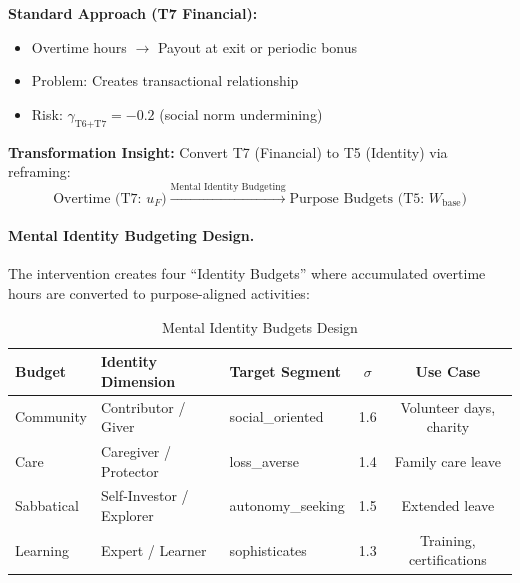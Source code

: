 \begin{tcolorbox}[colback=red!5!white, colframe=red!75!black,
    title=\textbf{Design Challenge: T7 Crowding-Out}]

\textbf{Standard Approach (T7 Financial):}
\begin{itemize}[nosep]
    \item Overtime hours $\rightarrow$ Payout at exit or periodic bonus
    \item Problem: Creates transactional relationship
    \item Risk: $\gamma_{\text{T6+T7}} = -0.2$ (social norm undermining)
\end{itemize}

\textbf{Transformation Insight:} Convert T7 (Financial) to T5 (Identity) via reframing:
\begin{equation}
\text{Overtime (T7: } u_F\text{)} \xrightarrow{\text{Mental Identity Budgeting}} \text{Purpose Budgets (T5: } W_{\text{base}}\text{)}
\label{eq:hhh-t7-t5-transformation}
\end{equation}

\end{tcolorbox}

\paragraph{Mental Identity Budgeting Design.}

The intervention creates four ``Identity Budgets'' where accumulated overtime hours are converted to purpose-aligned activities:

\begin{table}[htbp]
\centering
\caption{Mental Identity Budgets Design}
\label{tab:hhh-identity-budgets}
\renewcommand{\arraystretch}{1.3}
\small
\begin{tabular}{@{}lllcc@{}}
\toprule
\textbf{Budget} & \textbf{Identity Dimension} & \textbf{Target Segment} & \textbf{$\sigma$} & \textbf{Use Case} \\
\midrule
Community & Contributor / Giver & social\_oriented & 1.6 & Volunteer days, charity \\
Care & Caregiver / Protector & loss\_averse & 1.4 & Family care leave \\
Sabbatical & Self-Investor / Explorer & autonomy\_seeking & 1.5 & Extended leave \\
Learning & Expert / Learner & sophisticates & 1.3 & Training, certifications \\
\bottomrule
\end{tabular}
\end{table}

